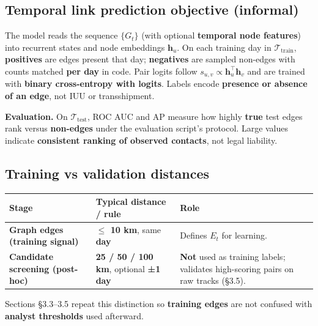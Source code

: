 \documentclass[
]{article}
\newcounter{none} %
\begin{document}
\subsection*{Temporal link prediction objective
(informal)}\label{temporal-link-prediction-objective-informal}

The model reads the sequence \(\{G_t\}\) (with optional \textbf{temporal
node features}) into recurrent states and node embeddings
\(\mathbf{h}_u\). On each training day in
\(\mathcal{T}_{\mathrm{train}}\), \textbf{positives} are edges present
that day; \textbf{negatives} are sampled non-edges with counts matched
\textbf{per day} in code. Pair logits follow
\(s_{u,v} \propto \mathbf{h}_u^\top \mathbf{h}_v\) and are trained with
\textbf{binary cross-entropy with logits}. Labels encode
\textbf{presence or absence of an edge}, not IUU or transshipment.

\textbf{Evaluation.} On \(\mathcal{T}_{\mathrm{test}}\), ROC AUC and AP
measure how highly \textbf{true} test edges rank versus
\textbf{non-edges} under the evaluation script's protocol. Large values
indicate \textbf{consistent ranking of observed contacts}, not legal
liability.

\subsection*{Training vs validation
distances}\label{training-vs-validation-distances}

{\def\LTcaptype{none} %
\begin{longtable}[]{@{}
  >{\raggedright\arraybackslash}p{}
  >{\raggedright\arraybackslash}p{}
  >{\raggedright\arraybackslash}p{}@{}}
\toprule\noalign{}
\begin{minipage}[b]{\linewidth}\raggedright
Stage
\end{minipage} & \begin{minipage}[b]{\linewidth}\raggedright
Typical distance / rule
\end{minipage} & \begin{minipage}[b]{\linewidth}\raggedright
Role
\end{minipage} \\
\midrule\noalign{}
\endhead
\bottomrule\noalign{}
\endlastfoot
\textbf{Graph edges (training signal)} & \textbf{\(\leq\) 10 km}, same
\textbf{day} & Defines \(E_t\) for learning. \\
\textbf{Candidate screening (post-hoc)} & \textbf{25 / 50 / 100 km},
optional \textbf{±1 day} & \textbf{Not} used as training labels;
validates high-scoring pairs on raw tracks (§3.5). \\
\end{longtable}
}

Sections §3.3--3.5 repeat this distinction so \textbf{training edges}
are not confused with \textbf{analyst thresholds} used afterward.
\end{document}
